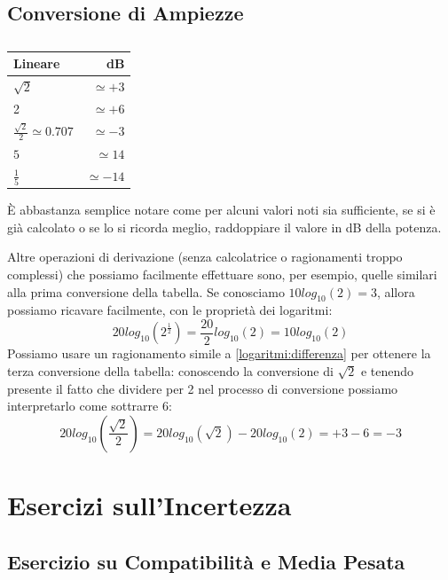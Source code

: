 \documentclass[a4paper,11pt]{report}
\begin{document}
\section{Conversione di Ampiezze}
\begin{table}[H]
  \caption{}
  \label{tab:}

  \begin{center}
    \begin{tabular}{|l|r|}
    \hline
    Lineare                               & dB\\
    \hline
       $\sqrt{2}$                         & $\simeq +3$ \\
    \hline
       2                                  & $\simeq +6$ \\
    \hline
       $\frac{\sqrt{2}}{2} \simeq 0.707$  & $\simeq -3$ \\
    \hline
       $5$                                & $\simeq 14$ \\
    \hline
       $\frac{1}{5}$                      & $\simeq -14$ \\
    \hline
    \end{tabular}
  \end{center}
\end{table}
È abbastanza semplice notare come per alcuni valori noti sia sufficiente, se si è già calcolato o se lo si ricorda meglio, raddoppiare il valore in dB della potenza.

Altre operazioni di derivazione (senza calcolatrice o ragionamenti troppo complessi) che possiamo facilmente effettuare sono, per esempio, quelle similari alla prima conversione della tabella. Se conosciamo $10log_{10}(2) = 3$, allora possiamo ricavare facilmente, con le proprietà dei logaritmi:
$$
  20log_{10}(2^{\frac{1}{2}}) = \frac{20}{2}log_{10}(2) = 10log_{10}(2)
$$
Possiamo usare un ragionamento simile a \ref{logaritmi:differenza} per ottenere la terza conversione della tabella: conoscendo la conversione di $\sqrt{2}$ e tenendo presente il fatto che dividere per 2 nel processo di conversione possiamo interpretarlo come sottrarre 6:
$$
  20log_{10}(\frac{\sqrt{2}}{2}) = 20log_{10}(\sqrt{2})-20log_{10}(2) = +3-6 = -3
$$ 
\chapter{Esercizi sull'Incertezza}
\section{Esercizio su Compatibilità e Media Pesata}
\end{document}
